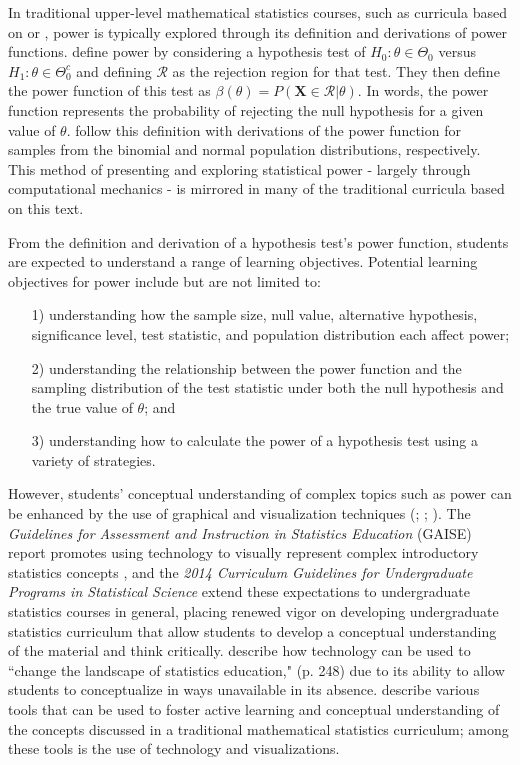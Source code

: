 \documentclass{TISE}
\begin{document}
In traditional upper-level mathematical statistics courses, such as curricula based on \citet{wackerly2008} or \citet{casella2002}, power is typically explored through its definition and derivations of power functions. \cite{casella2002} define power by considering a hypothesis test of $H_0 : \theta \in \Theta_0$ versus $H_1 : \theta \in \Theta_0^c$ and defining $\mathcal{R}$ as the rejection region for that test. They then define the power function of this test as $\beta(\theta) = P(\boldsymbol{X} \in \mathcal{R} | \theta)$. In words, the power function represents the probability of rejecting the null hypothesis for a given value of $\theta$. \cite{casella2002} follow this definition with derivations of the power function for samples from the binomial and normal population distributions, respectively. This method of presenting and exploring statistical power - largely through computational mechanics - is mirrored in many of the traditional curricula based on this text. 

From the definition and derivation of a hypothesis test's power function, students are expected to understand a range of learning objectives. Potential learning objectives for power include but are not limited to:
\begin{itemize}
	\item[1)] understanding how the sample size, null value, alternative hypothesis, significance level, test statistic, and population distribution each affect power;
	\item[2)] understanding the relationship between the power function and the sampling distribution of the test statistic under both the null hypothesis and the true value of $\theta$; and
	\item[3)] understanding how to calculate the power of a hypothesis test using a variety of strategies.
\end{itemize}

However, students' conceptual understanding of complex topics such as power can be enhanced by the use of graphical and visualization techniques (\citealt{delMas1999}; \citealt{chance2007}; \citealt{bobek2016}). The \textit{Guidelines for Assessment and Instruction in Statistics Education} (GAISE) report promotes using technology to visually represent complex introductory statistics concepts \citep{ASA2016}, and the \textit{2014 Curriculum Guidelines for Undergraduate Programs in Statistical Science} \citep{ASA2014} extend these expectations to undergraduate statistics courses in general, placing renewed vigor on developing undergraduate statistics curriculum that allow students to develop a conceptual understanding of the material and think critically. \cite{wild2011} describe how technology can be used to ``change the landscape of statistics education," (p. 248) due to its ability to allow students to conceptualize in ways unavailable in its absence. \cite{green2015} describe various tools that can be used to foster active learning and conceptual understanding of the concepts discussed in a traditional mathematical statistics curriculum; among these tools is the use of technology and visualizations. 
\end{document}
